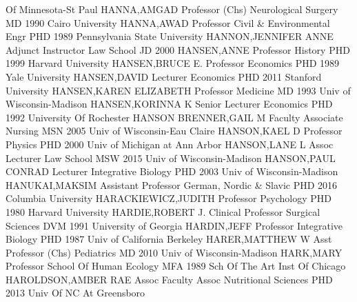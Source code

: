 \documentclass[
]{article}
\begin{document}
Of Minnesota-St Paul \textbar{}  \textbar HANNA,AMGAD
\textbar Professor (Chs) \textbar Neurological Surgery \textbar MD 1990
Cairo University \textbar{}  \textbar HANNA,AWAD
\textbar Professor \textbar Civil \& Environmental Engr \textbar PHD
1989 Pennsylvania State University \textbar{} 
\textbar HANNON,JENNIFER ANNE \textbar Adjunct Instructor \textbar Law
School \textbar JD 2000 \textbar{}  \textbar HANSEN,ANNE
\textbar Professor \textbar History \textbar PHD 1999 Harvard University
\textbar{}  \textbar HANSEN,BRUCE E. \textbar Professor
\textbar Economics \textbar PHD 1989 Yale University \textbar{}
 \textbar HANSEN,DAVID \textbar Lecturer \textbar Economics
\textbar PHD 2011 Stanford University \textbar{} 
\textbar HANSEN,KAREN ELIZABETH \textbar Professor \textbar Medicine
\textbar MD 1993 Univ of Wisconsin-Madison \textbar{} 
\textbar HANSEN,KORINNA K \textbar Senior Lecturer \textbar Economics
\textbar PHD 1992 University Of Rochester \textbar{} 
\textbar HANSON BRENNER,GAIL M \textbar Faculty Associate
\textbar Nursing \textbar MSN 2005 Univ of Wisconsin-Eau Claire
\textbar{}  \textbar HANSON,KAEL D \textbar Professor
\textbar Physics \textbar PHD 2000 Univ of Michigan at Ann Arbor
\textbar{}  \textbar HANSON,LANE L \textbar Assoc Lecturer
\textbar Law School \textbar MSW 2015 Univ of Wisconsin-Madison
\textbar{}  \textbar HANSON,PAUL CONRAD \textbar Lecturer
\textbar Integrative Biology \textbar PHD 2003 Univ of Wisconsin-Madison
\textbar{}  \textbar HANUKAI,MAKSIM \textbar Assistant
Professor \textbar German, Nordic \& Slavic \textbar PHD 2016 Columbia
University \textbar{}  \textbar HARACKIEWICZ,JUDITH
\textbar Professor \textbar Psychology \textbar PHD 1980 Harvard
University \textbar{}  \textbar HARDIE,ROBERT J.
\textbar Clinical Professor \textbar Surgical Sciences \textbar DVM 1991
University of Georgia \textbar{}  \textbar HARDIN,JEFF
\textbar Professor \textbar Integrative Biology \textbar PHD 1987 Univ
of California Berkeley \textbar{}  \textbar HARER,MATTHEW W
\textbar Asst Professor (Chs) \textbar Pediatrics \textbar MD 2010 Univ
of Wisconsin-Madison \textbar{}  \textbar HARK,MARY
\textbar Professor \textbar School Of Human Ecology \textbar MFA 1989
Sch Of The Art Inst Of Chicago \textbar{} 
\textbar HAROLDSON,AMBER RAE \textbar Assoc Faculty Assoc
\textbar Nutritional Sciences \textbar PHD 2013 Univ Of NC At Greensboro
\end{document}
